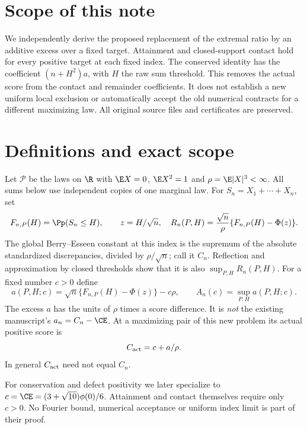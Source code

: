 \section*{Scope of this note}
We independently derive the proposed replacement of the extremal ratio by
an additive excess over a fixed target. Attainment and closed-support
contact hold for every positive target at each fixed index. The conserved
identity has the coefficient $(n+H^2)a$, with $H$ the raw sum threshold.
This removes the actual score from the contact and remainder coefficients.
It does not establish a new uniform local exclusion or automatically
accept the old numerical contracts for a different maximizing law. All original source
files and certificates are preserved.

\section{Definitions and exact scope}
Let $\mathcal P$ be the laws on $\R$ with $\E X=0$, $\E X^2=1$ and
$\rho=\E|X|^3<\infty$. All sums below use independent copies of one
marginal law. For $S_n=X_1+\cdots+X_n$, set
\[
 F_{n,P}(H)=\Pp(S_n\le H),\qquad z=H/\sqrt n,
 \quad R_n(P,H)=\frac{\sqrt n}{\rho}\{F_{n,P}(H)-\Phi(z)\}.
\]
The global Berry--Esseen constant at this index is the supremum of the
absolute standardized discrepancies, divided by $\rho/\sqrt n$; call it
$C_n$. Reflection and approximation by closed thresholds show that it is
also $\sup_{P,H}R_n(P,H)$. For a fixed number $c>0$ define
\[
 a(P,H;c)=\sqrt n\{F_{n,P}(H)-\Phi(z)\}-c\rho,
 \qquad A_n(c)=\sup_{P,H}a(P,H;c).
\]
The excess $a$ has the units of $\rho$ times a score difference. It is
\emph{not} the existing manuscript's $a_n=C_n-\CE$. At a maximizing pair
of this new problem its actual positive score is
\begin{equation}\label{v4excess:eq:actual}
 C_{\rm act}=c+a/\rho.
\end{equation}
In general $C_{\rm act}$ need not equal $C_n$.

For conservation and defect positivity we later specialize to
$c=\CE=(3+\sqrt{10})\phi(0)/6$. Attainment and contact themselves require
only $c>0$. No Fourier bound, numerical acceptance or uniform index limit
is part of their proof.

